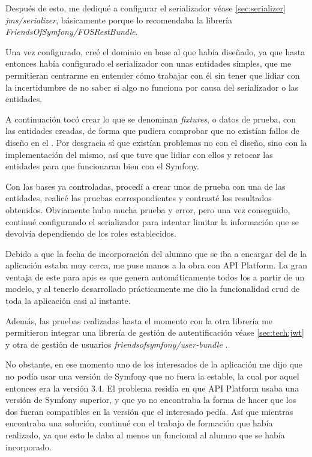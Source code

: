 Después de esto, me dediqué a configurar el serializador \textemdash véase
\ref{sec:serializer} \textemdash \textit{jms/serializer}, básicamente porque
lo recomendaba la librería \textit{FriendsOfSymfony/FOSRestBundle}.

Una vez configurado, creé el dominio en base al  que había diseñado, ya que hasta entonces había configurado
el serializador con unas entidades simples, que me permitieran centrarme en
entender cómo trabajar con él sin tener que lidiar con la incertidumbre de
no saber si algo no funciona por causa del serializador o las entidades.

A continuación tocó crear lo que se denominan \textit{fixtures}, o datos de
prueba, con las entidades creadas, de forma que pudiera comprobar que no
existían fallos de diseño en el .
Por desgracia sí que existían problemas no con el diseño, sino con la
implementación del mismo, así que tuve que lidiar con ellos y retocar las
entidades para que funcionaran bien con el 
Symfony.

Con las bases ya controladas, procedí a crear unos 
de prueba con una de las entidades, realicé las pruebas correspondientes y contrasté
los resultados obtenidos. Obviamente hubo mucha prueba y error, pero una vez
conseguido, continué configurando el serializador para intentar limitar la
información que se devolvía dependiendo de los roles establecidos.

Debido a que la fecha de incorporación del alumno que se iba a encargar del 
de la aplicación estaba muy cerca, me puse manos a la obra con API Platform. La
gran ventaja de este  para \gls{api}s es que
genera automáticamente todos los  a partir de un modelo,
y al tenerlo desarrollado prácticamente me dio la funcionalidad \gls{crud} de toda
la aplicación casi al instante.

Además, las pruebas realizadas hasta el momento con la otra librería me permitieron
integrar una librería de gestión de autentificación \textemdash véase \ref{sec:tech:jwt}
\textemdash y otra de gestión de usuarios \textemdash \textit{friendsofsymfony/user-bundle}
\textemdash.

No obstante, en ese momento uno de los interesados de la aplicación me dijo que no
podía usar una versión de Symfony que no fuera la estable, la cual por aquel
entonces era la versión 3.4. El problema residía en que API Platform usaba una
versión de Symfony superior, y que yo no encontraba la forma de hacer que
los dos  fueran compatibles en la versión que
el interesado pedía. Así que mientras encontraba una solución, continué con
el trabajo de formación que había realizado, ya que esto le daba al menos un
 funcional al alumno que se había incorporado.

